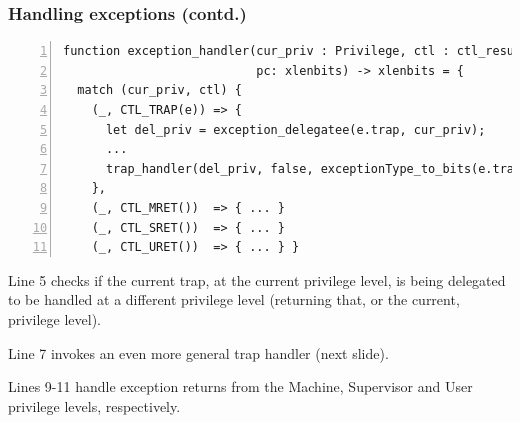 \documentclass[aspectratio=169]{beamer}
\newcommand{\slidefont}{\scriptsize}
\begin{document}
\begin{frame}[fragile]
  \frametitle{Handling exceptions (contd.)}

  \slidefont

  \begin{Verbatim}[frame=single, numbers=left, label = File riscv\_sys\_control.sail]
function exception_handler(cur_priv : Privilege, ctl : ctl_result,
                           pc: xlenbits) -> xlenbits = {
  match (cur_priv, ctl) {
    (_, CTL_TRAP(e)) => {
      let del_priv = exception_delegatee(e.trap, cur_priv);
      ...
      trap_handler(del_priv, false, exceptionType_to_bits(e.trap), pc, e.excinfo, e.ext)
    },
    (_, CTL_MRET())  => { ... }
    (_, CTL_SRET())  => { ... }
    (_, CTL_URET())  => { ... } }
  \end{Verbatim}

  \begin{minipage}{\textwidth}
    Line 5 checks if the current trap, at the current privilege level,
    is being delegated to be handled at a different privilege level
    (returning that, or the current, privilege level).

    \vspace{1ex}

    Line 7 invokes an even more general trap handler (next slide).

    \vspace{1ex}

    Lines 9-11 handle exception returns from the Machine, Supervisor
    and User privilege levels, respectively.
  \end{minipage}

\end{frame}

\end{document}
